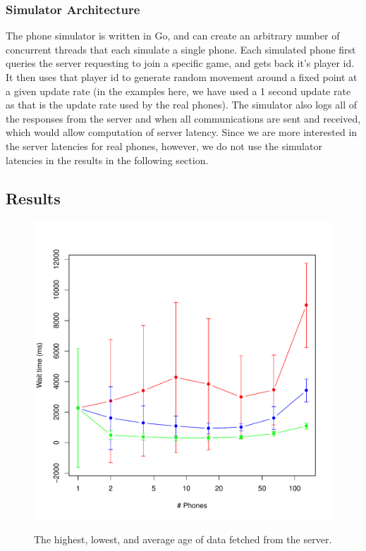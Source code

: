 \documentclass{acm_proc_article-sp}
\begin{document}
\subsubsection{Simulator Architecture}
The phone simulator is written in Go, and can create an arbitrary
number of concurrent threads that each simulate a single phone.  Each
simulated phone first queries the server requesting to join a specific
game, and gets back it's player id.  It then uses that player id to
generate random movement around a fixed point at a given update rate
(in the examples here, we have used a 1 second update rate as that is
the update rate used by the real phones). The simulator also logs all
of the responses from the server and when all communications are sent
and received, which would allow computation of server latency.  Since
we are more interested in the server latencies for real phones,
however, we do not use the simulator latencies in the results in the
following section.

\subsection{Results}


\begin{figure}
\centering
\includegraphics[scale=0.5]{figs/serverQueueLatency}
\label{fig:serverQueueLatency}
\caption{The highest, lowest, and average age of data fetched from the server.}
\end{figure}
\end{document}
